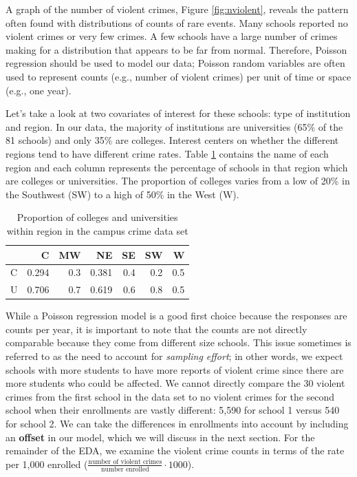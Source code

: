 \documentclass[
]{krantz}
\begin{document}
A graph of the number of violent crimes, Figure \ref{fig:nviolent}, reveals the pattern often found with distributions of counts of rare events. Many schools reported no violent crimes or very few crimes. A few schools have a large number of crimes making for a distribution that appears to be far from normal. Therefore, Poisson regression should be used to model our data; Poisson random variables are often used to represent counts (e.g., number of violent crimes) per unit of time or space (e.g., one year).

Let's take a look at two covariates of interest for these schools: type of institution and region. In our data, the majority of institutions are universities (65\% of the 81 schools) and only 35\% are colleges. Interest centers on whether the different regions tend to have different crime rates. Table \ref{tab:regions} contains the name of each region and each column represents the percentage of schools in that region which are colleges or universities. The proportion of colleges varies from a low of 20\% in the Southwest (SW) to a high of 50\% in the West (W).

\begin{table}

\caption{\label{tab:regions}Proportion of colleges and universities within region in the campus crime data set}
\centering
\begin{tabular}[t]{lrrrrrr}
\toprule
  & C & MW & NE & SE & SW & W\\
\midrule
C & 0.294 & 0.3 & 0.381 & 0.4 & 0.2 & 0.5\\
U & 0.706 & 0.7 & 0.619 & 0.6 & 0.8 & 0.5\\
\bottomrule
\end{tabular}
\end{table}

While a Poisson regression model is a good first choice because the responses are counts per year, it is important to note that the counts are not directly comparable because they come from different size schools. This issue sometimes is referred to as the need to account for \emph{sampling effort}; in other words, we expect schools with more students to have more reports of violent crime since there are more students who could be affected. We cannot directly compare the 30 violent crimes from the first school in the data set to no violent crimes for the second school when their enrollments are vastly different: 5,590 for school 1 versus 540 for school 2. We can take the differences in enrollments into account by including an \textbf{offset} in our model, which we will discuss in the next section. For the remainder of the EDA, we examine the violent crime counts in terms of the rate per 1,000 enrolled (\(\frac{\textrm{number of violent crimes}}{\textrm{number enrolled}} \cdot 1000\)).
\end{document}
